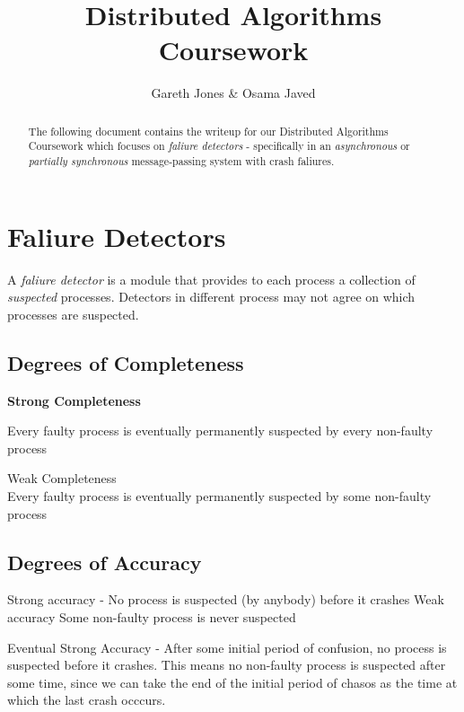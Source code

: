 \documentclass{article}
\begin{document}
\title{Distributed Algorithms Coursework}
\author{Gareth Jones \& Osama Javed}

\maketitle

\begin{abstract}
The following document contains the writeup for our Distributed Algorithms Coursework which focuses on {\em faliure detectors} - specifically in an {\em asynchronous} or {\em partially synchronous} message-passing system with crash faliures.
\end{abstract}

\newpage

\section{Faliure Detectors}

A {\em faliure detector} is a module that provides to each process a collection of {\em suspected} processes.  Detectors in different process may not agree on which processes are suspected.

\subsection{Degrees of Completeness}

{\bf Strong Completeness}\\ 
\begin{adjustwidth}{0.5cm}{}
Every faulty process is eventually permanently suspected by every non-faulty process
\end{adjustwidth}
\vspace{3mm}

\noindent
Weak Completeness\\
\indent 
Every faulty process is eventually permanently suspected by some non-faulty process


\subsection{Degrees of Accuracy}

Strong accuracy - No process is suspected (by anybody) before it crashes
Weak accuracy Some non-faulty process is never suspected

Eventual Strong Accuracy - After some initial period of confusion, no process is suspected before it crashes.  This means no non-faulty process is suspected after some time, since we can take the end of the initial period of chasos as the time at which the last crash occcurs.
\end{document}
